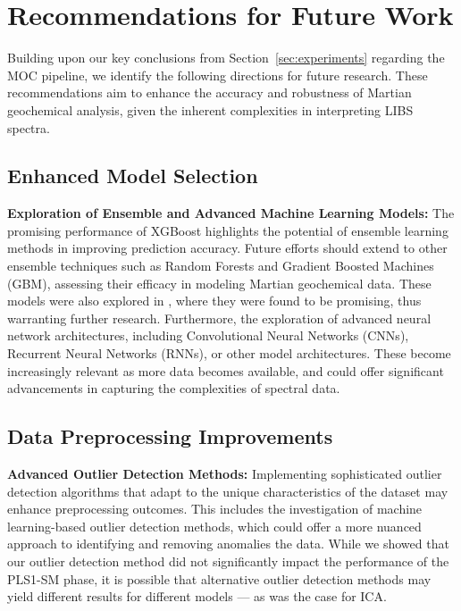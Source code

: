 \section{Recommendations for Future Work}\label{sec:recommendations_for_future_work}
Building upon our key conclusions from Section~\ref{sec:experiments} regarding the MOC pipeline, we identify the following directions for future research.
These recommendations aim to enhance the accuracy and robustness of Martian geochemical analysis, given the inherent complexities in interpreting LIBS spectra.

\subsection{Enhanced Model Selection}

\textbf{Exploration of Ensemble and Advanced Machine Learning Models:} The promising performance of XGBoost highlights the potential of ensemble learning methods in improving prediction accuracy. 
Future efforts should extend to other ensemble techniques such as Random Forests and Gradient Boosted Machines (GBM), assessing their efficacy in modeling Martian geochemical data.
These models were also explored in \citet{andersonPostlandingMajorElement2022}, where they were found to be promising, thus warranting further research.
Furthermore, the exploration of advanced neural network architectures, including Convolutional Neural Networks (CNNs), Recurrent Neural Networks (RNNs), or other model architectures.
These become increasingly relevant as more data becomes available, and could offer significant advancements in capturing the complexities of spectral data.

\subsection{Data Preprocessing Improvements}

\textbf{Advanced Outlier Detection Methods:} Implementing sophisticated outlier detection algorithms that adapt to the unique characteristics of the dataset may enhance preprocessing outcomes.
This includes the investigation of machine learning-based outlier detection methods, which could offer a more nuanced approach to identifying and removing anomalies the data.
While we showed that our outlier detection method did not significantly impact the performance of the PLS1-SM phase, it is possible that alternative outlier detection methods may yield different results for different models --- as was the case for ICA.

